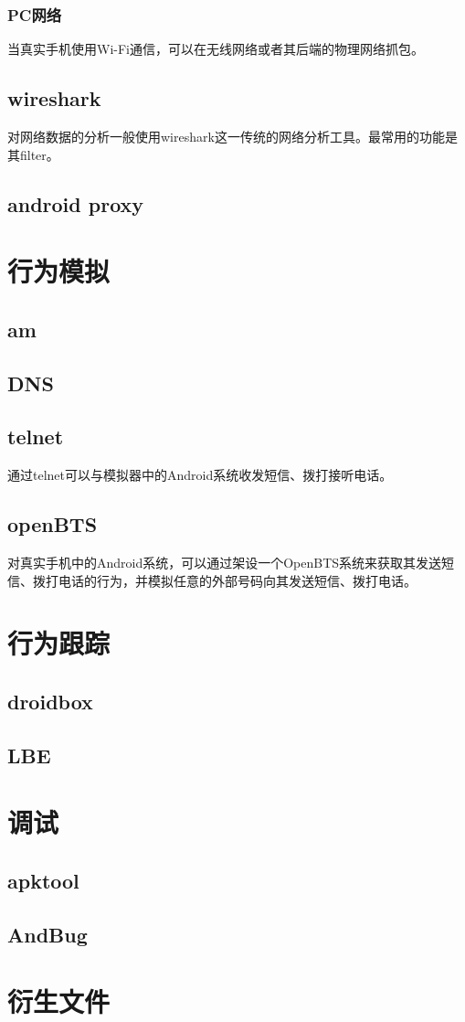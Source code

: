 \subsubsection{PC网络}
当真实手机使用Wi-Fi通信，可以在无线网络或者其后端的物理网络抓包。
\subsection{wireshark}
对网络数据的分析一般使用wireshark这一传统的网络分析工具。最常用的功能是其filter。

\subsection{android proxy}
\section{行为模拟}
\subsection{am}

\subsection{DNS}

\subsection{telnet}
通过telnet可以与模拟器中的Android系统收发短信、拨打接听电话。
\subsection{openBTS}
对真实手机中的Android系统，可以通过架设一个OpenBTS系统来获取其发送短信、拨打电话的行为，并模拟任意的外部号码向其发送短信、拨打电话。

\section{行为跟踪}
\subsection{droidbox}
\subsection{LBE}

\section{调试}
\label{Sec:debug}
\subsection{apktool}
\subsection{AndBug}

\section{衍生文件}
